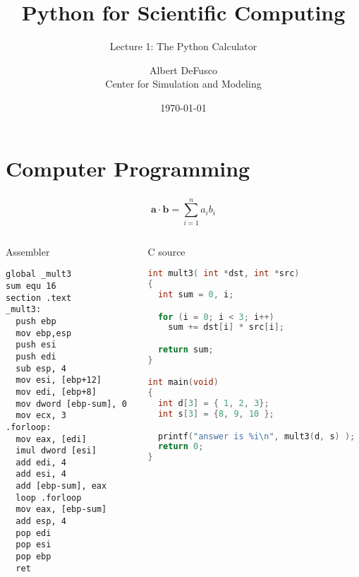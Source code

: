 \documentclass[xcolor=table,10pt,final]{beamer}
\begin{document}
\title{Python for Scientific Computing}
\subtitle{Lecture 1: The Python Calculator}
\author{Albert DeFusco\\Center for Simulation and Modeling}
\date{\today}
\frame{\titlepage}

\section{Computer Programming}
\frame{\sectionpage}
\begin{frame}[fragile]
  \frametitle{} %
  {\scriptsize
  \begin{equation*}
    \mathbf{a}\cdot\mathbf{b} = \sum_{i=1}^{n}a_ib_i
  \end{equation*}
}
  \begin{columns}
    \begin{column}{0.5\paperwidth}
      \begin{block}{Assembler}
\lstset{
      basicstyle=\tiny
    }
  \begin{lstlisting}[language={[x86masm]Assembler}]
global _mult3
sum equ 16
section .text
_mult3:
  push ebp
  mov ebp,esp
  push esi
  push edi
  sub esp, 4
  mov esi, [ebp+12]
  mov edi, [ebp+8]
  mov dword [ebp-sum], 0
  mov ecx, 3
.forloop:
  mov eax, [edi]
  imul dword [esi]
  add edi, 4
  add esi, 4
  add [ebp-sum], eax
  loop .forloop
  mov eax, [ebp-sum]
  add esp, 4
  pop edi
  pop esi
  pop ebp
  ret
\end{lstlisting}
\end{block}
\end{column}
\begin{column}{0.35\paperwidth}
  \begin{block}{C source\footnotemark}
\lstset{
      basicstyle=\tiny
    }
  \begin{lstlisting}[language=C]
int mult3( int *dst, int *src)
{
  int sum = 0, i;

  for (i = 0; i < 3; i++)
    sum += dst[i] * src[i];

  return sum;
}

int main(void)
{
  int d[3] = { 1, 2, 3};
  int s[3] = {8, 9, 10 };

  printf("answer is %i\n", mult3(d, s) );
  return 0;
}
      \end{lstlisting}
    \end{block}
    \end{column}
  \end{columns}
  {\tiny {}}
\end{frame}
\end{document}

